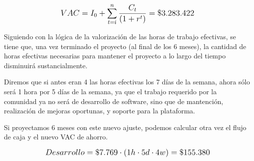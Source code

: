 \[
\mathlarger{
	{VAC} = I_0 + \sum\limits_{t=i}^{n}\frac{C_t}{\left(1+r^t\right)} = \$3.283.422
}
\]

Siguiendo con la lógica de la valorización de las horas de trabajo efectivas, se tiene que, una vez terminado el proyecto (al final de los 6 meses), la cantidad de horas efectivas necesarias para mantener el proyecto a lo largo del tiempo disminuirá sustancialmente.

Diremos que si antes eran 4 las horas efectivas los 7 días de la semana, ahora sólo será 1 hora por 5 días de la semana, ya que el trabajo requerido por la comunidad ya no será de desarrollo de software, sino que de mantención, realización de mejoras oportunas, y soporte para la plataforma.

Si proyectamos 6 meses con este nuevo ajuste, podemos calcular otra vez el flujo de caja y el nuevo VAC de ahorro.

\[
\mathlarger{
	Desarrollo = \$7.769 \cdot \left(1h\cdot5d\cdot4w\right) = \$155.380
}
\]

